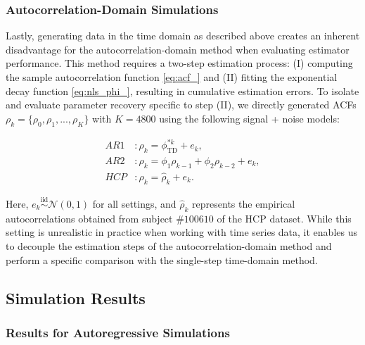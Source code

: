 \documentclass[9pt]{article}
\newcommand{\phitd}{\phi_{\scriptscriptstyle\text{TD}}}
\begin{document}
\subsubsection{Autocorrelation-Domain Simulations}
Lastly, generating data in the time domain as described above creates an inherent disadvantage for the autocorrelation-domain method when evaluating estimator performance. This method requires a two-step estimation process: (I) computing the sample autocorrelation function \eqref{eq:acf_} and (II) fitting the exponential decay function \eqref{eq:nls_phi_}, resulting in cumulative estimation errors. To isolate and evaluate parameter recovery specific to step (II), we directly generated ACFs $\rho_k = \{\rho_0, \rho_1, ..., \rho_K\}$ with $K=4800$ using the following signal + noise models:

\begin{align}
    \textit{AR1}&: \rho_k = \phitd^{*k} + e_k,\label{eq:sim-ad-ar1}\\
    \textit{AR2}&: \rho_k = \phi_1\rho_{k-1} + \phi_2\rho_{k-2} + e_k,\label{eq:sim-ad-ar2}\\
    \textit{HCP}&: \rho_k = \hat\rho_k + e_k.\label{eq:sim-ad-hcp}
\end{align}

\noindent Here, $e_k \overset{\text{iid}}{\sim} \mathcal{N}(0, 1)$ for all settings, and $\hat\rho_k$ represents the empirical autocorrelations obtained from subject $\#100610$ of the HCP dataset. While this setting is unrealistic in practice when working with time series data, it enables us to decouple the estimation steps of the autocorrelation-domain method and perform a specific comparison with the single-step time-domain method.

\subsection{Simulation Results}

\subsubsection{Results for Autoregressive Simulations}
\end{document}

